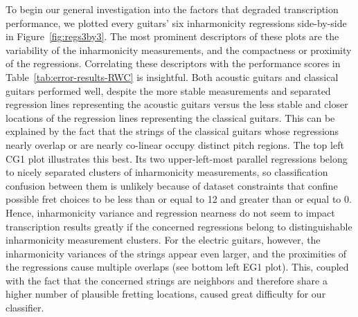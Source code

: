 \documentclass[12pt]{cmuthesis}
\begin{document}
To begin our general investigation into the factors that degraded transcription performance, we plotted every guitars' six inharmonicity regressions side-by-side in Figure~\ref{fig:regs3by3}. The most prominent descriptors of these plots are the variability of the inharmonicity measurements, and the compactness or proximity of the regressions. Correlating these descriptors with the performance scores in Table~\ref{tab:error-results-RWC} is insightful. Both acoustic guitars and classical guitars performed well, despite the more stable measurements and separated regression lines representing the acoustic guitars versus the less stable and closer locations of the regression lines representing the classical guitars. This can be explained by the fact that the strings of the classical guitars whose regressions nearly overlap or are nearly co-linear occupy distinct pitch regions. The top left CG1 plot illustrates this best. Its two upper-left-most parallel regressions belong to nicely separated clusters of inharmonicity measurements, so classification confusion between them is unlikely because of dataset constraints that confine possible fret choices to be less than or equal to 12 and greater than or equal to 0. Hence, inharmonicity variance and regression nearness do not seem to impact transcription results greatly if the concerned regressions belong to distinguishable inharmonicity measurement clusters. For the electric guitars, however, the inharmonicity variances of the strings appear even larger, and the proximities of the regressions cause multiple overlaps (see bottom left EG1 plot). This, coupled with the fact that the concerned strings are neighbors and therefore share a higher number of plausible fretting locations, caused great difficulty for our classifier.

\end{document}
